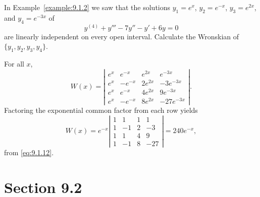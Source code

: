 \setcounter{example}{3}
\begin{example}
  \label{example:9.1.4} \rm In Example~\ref{example:9.1.2} we saw that the solutions $y_{1}=e^{x}$,
  $y_{2}=e^{-x}$, $y_{3}=e^{2x}$, and $y_{4}=e^{-3x}$ of
  \[
    y^{(4)}+y'''-7y''-y'+6y=0
  \]
  are linearly independent on every open interval. Calculate the Wronskian of
  $\{y_{1},y_{2},y_{3},y_{4}\}$.
\end{example}
\begin{examplesolution}
\solution For all $x$,
\[
  W(x)=\left|
  \begin{array}{rrrr}
    e^{x} & e^{-x}  & e^{2x}  & e^{-3x}    \\
    e^{x} & -e^{-x} & 2e^{2x} & -3e^{-3x}  \\
    e^{x} & e^{-x}  & 4e^{2x} & 9e^{-3x}   \\
    e^{x} & -e^{-x} & 8e^{2x} & -27e^{-3x}
  \end{array}\right|.
\]
Factoring the exponential common factor from each row yields
\[
  W(x)=e^{-x}\left|
  \begin{array}{rrrr}
    1 & 1  & 1 & 1   \\
    1 & -1 & 2 & -3  \\
    1 & 1  & 4 & 9   \\
    1 & -1 & 8 & -27
  \end{array}\right|=240e^{-x},
\]
from \eqref{eq:9.1.12}.
\end{examplesolution}

\section*{Section 9.2}
\setcounter{chapter}{9}
\setcounter{section}{2}

